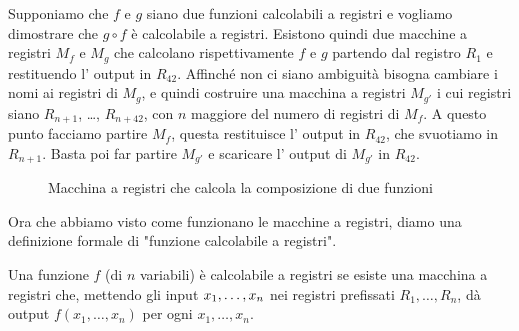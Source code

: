 \begin{esempio}[Composizione]

    Supponiamo che $ f $ e $ g $ siano due funzioni calcolabili a
    registri e vogliamo dimostrare che $ g\circ f $ \`e calcolabile a
    registri. Esistono quindi due macchine a registri \( M_f \) e \(
    M_g \) che calcolano rispettivamente \( f \) e \( g \) partendo
    dal registro \( R_1 \) e restituendo l' output in \( R_42
    \). Af\mbox{}f\mbox{}inch\'e non ci siano ambiguit\`a bisogna
    cambiare i nomi ai registri di \( M_g \), e quindi costruire una
    macchina a registri \( M_{g'} \) i cui re\-gi\-stri siano \(
    R_{n+1} \), \ldots, \( R_{n+42} \), con \( n \) maggiore del
    numero di registri di \( M_f \). A questo punto facciamo partire
    \( M_f \), questa restituisce l' output in \( R_{42} \), che
    svuotiamo in \( R_{n+1} \). Basta poi far partire \( M_{g'} \) e
    scaricare l' output di \( M_{g'} \) in \( R_{42} \).


    \begin{figure}[hbpt]
    \hspace{0cm} 
     \caption{Macchina a registri che calcola la composizione di due funzioni}
    \end{figure}
\end{esempio}

Ora che abbiamo visto come funzionano le macchine a registri, diamo
una definizione formale di "funzione calcolabile a re\-gi\-stri".

\begin{thm}
Una funzione \( f \) (di \( n \) variabili) \`e calcolabile a registri
se esiste una macchina a registri che, mettendo gli input \( x_1,
\ldots,\\ x_n \) nei registri pref\mbox{}issati \( R_1, \ldots, R_n
\), d\`a output \( f(x_1, \ldots, x_n) \) per ogni \( x_1, \ldots, x_n
\).
\end{thm}
